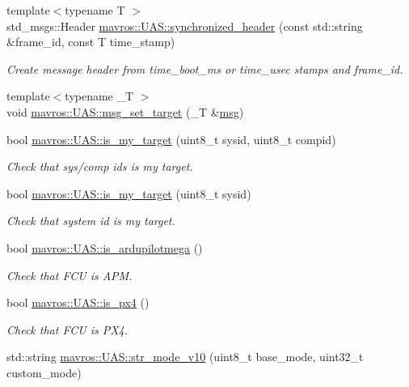 \begin{DoxyCompactItemize}
\item 
{\footnotesize template$<$typename T $>$ }\\std\+\_\+msgs\+::\+Header \mbox{\hyperlink{group__nodelib_ga548327e4a73268424eb8a730be7e618d}{mavros\+::\+U\+A\+S\+::synchronized\+\_\+header}} (const std\+::string \&frame\+\_\+id, const T time\+\_\+stamp)
\begin{DoxyCompactList}\small\item\em Create message header from time\+\_\+boot\+\_\+ms or time\+\_\+usec stamps and frame\+\_\+id. \end{DoxyCompactList}\item 
{\footnotesize template$<$typename \+\_\+T $>$ }\\void \mbox{\hyperlink{group__nodelib_ga1fb94a2e20412126b42bcb872a7d0845}{mavros\+::\+U\+A\+S\+::msg\+\_\+set\+\_\+target}} (\+\_\+T \&\mbox{\hyperlink{stratnode_8cpp_a82cfe4ed9bc9e1b07c8bf209c324d85b}{msg}})
\item 
bool \mbox{\hyperlink{group__nodelib_ga1ed3e59972054c99c9c5d7205bdbe3bc}{mavros\+::\+U\+A\+S\+::is\+\_\+my\+\_\+target}} (uint8\+\_\+t sysid, uint8\+\_\+t compid)
\begin{DoxyCompactList}\small\item\em Check that sys/comp id\textquotesingle{}s is my target. \end{DoxyCompactList}\item 
bool \mbox{\hyperlink{group__nodelib_gaed7b8a1d25613984a83837958b0dde67}{mavros\+::\+U\+A\+S\+::is\+\_\+my\+\_\+target}} (uint8\+\_\+t sysid)
\begin{DoxyCompactList}\small\item\em Check that system id is my target. \end{DoxyCompactList}\item 
bool \mbox{\hyperlink{group__nodelib_gad1a57410bba40929fd2aa443e8706695}{mavros\+::\+U\+A\+S\+::is\+\_\+ardupilotmega}} ()
\begin{DoxyCompactList}\small\item\em Check that F\+CU is A\+PM. \end{DoxyCompactList}\item 
bool \mbox{\hyperlink{group__nodelib_ga03c6f1128530da35612a7d40eb5cb5ad}{mavros\+::\+U\+A\+S\+::is\+\_\+px4}} ()
\begin{DoxyCompactList}\small\item\em Check that F\+CU is P\+X4. \end{DoxyCompactList}\item 
std\+::string \mbox{\hyperlink{group__nodelib_gaa60e637dbc000f32038c9d8ad58c678a}{mavros\+::\+U\+A\+S\+::str\+\_\+mode\+\_\+v10}} (uint8\+\_\+t base\+\_\+mode, uint32\+\_\+t custom\+\_\+mode)

\end{DoxyCompactItemize}
